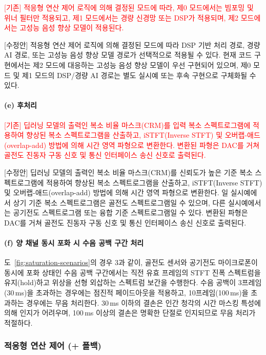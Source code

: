 \documentclass{article}
\newcommand{\reviewold}[1]{{\par\noindent\textcolor{red}{[기존] #1}}}
\newcommand{\reviewnew}[1]{{\par\noindent\textcolor{customblue}{[수정안] #1}}}
\newcommand{\reviewpair}[2]{\reviewold{#1}\reviewnew{#2}\par}
\begin{document}
\reviewpair{적응형 연산 제어 로직에 의해 결정된 모드에 따라, 제0 모드에서는 빔포밍 및 위너 필터만 적용되고, 제1 모드에서는 경량 신경망 또는 DSP가 적용되며, 제2 모드에서는 고성능 음성 향상 모델이 적용된다.}{적응형 연산 제어 로직에 의해 결정된 모드에 따라 DSP 기반 처리 경로, 경량 AI 경로, 또는 고성능 음성 향상 모델 경로가 선택적으로 적용될 수 있다. 현재 코드 구현에서는 제2 모드에 대응하는 고성능 음성 향상 모델이 우선 구현되어 있으며, 제0 모드 및 제1 모드의 DSP/경량 AI 경로는 별도 실시예 또는 후속 구현으로 구체화될 수 있다.}

\paragraph{(e) 후처리}

\reviewpair{딥러닝 모델의 출력인 복소 비율 마스크(CRM)를 입력 복소 스펙트로그램에 적용하여 향상된 복소 스펙트로그램을 산출하고, iSTFT(Inverse STFT) 및 오버랩-애드(overlap-add) 방법에 의해 시간 영역 파형으로 변환한다. 변환된 파형은 DAC를 거쳐 골전도 진동자 구동 신호 및 통신 인터페이스 송신 신호로 출력된다.}{딥러닝 모델의 출력인 복소 비율 마스크(CRM)를 신뢰도가 높은 기준 복소 스펙트로그램에 적용하여 향상된 복소 스펙트로그램을 산출하고, iSTFT(Inverse STFT) 및 오버랩-애드(overlap-add) 방법에 의해 시간 영역 파형으로 변환한다. 일 실시예에서 상기 기준 복소 스펙트로그램은 골전도 스펙트로그램일 수 있으며, 다른 실시예에서는 공기전도 스펙트로그램 또는 융합 기준 스펙트로그램일 수 있다. 변환된 파형은 DAC를 거쳐 골전도 진동자 구동 신호 및 통신 인터페이스 송신 신호로 출력된다.}

\paragraph{(f) 양 채널 동시 포화 시 수음 공백 구간 처리}

도~\ref{fig:saturation-scenarios}의 경우 3과 같이, 골전도 센서와 공기전도 마이크로폰이 동시에 포화 상태인 수음 공백 구간에서는 직전 유효 프레임의 STFT 진폭 스펙트럼을 유지(hold)하고 위상을 선형 외삽하는 스펙트럼 보간을 수행한다. 수음 공백이 3프레임(30\,ms)을 초과하는 경우에는 점진적 페이드아웃을 적용하고, 10프레임(100\,ms)을 초과하는 경우에는 무음 처리한다. 30\,ms 이하의 결손은 인간 청각의 시간 마스킹 특성에 의해 인지가 어려우며, 100\,ms 이상의 결손은 명확한 단절로 인지되므로 무음 처리가 적절하다.

\subsubsection{적응형 연산 제어 (+ 폴백)}
\end{document}
